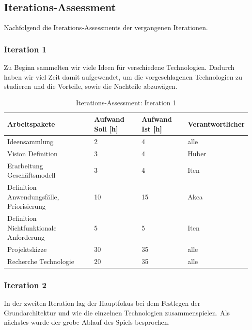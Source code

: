 \documentclass[11pt,ngerman]{article}
\begin{document}
\begin{table}[H]
	\label{tab:Iterationsplan}
    \end{table}

    \subsection{Iterations-Assessment}
    Nachfolgend die Iterations-Assessments der vergangenen Iterationen.

    \subsubsection{Iteration 1}

    Zu Beginn sammelten wir viele Ideen für verschiedene Technologien. Dadurch haben wir viel Zeit damit aufgewendet, um die vorgeschlagenen Technologien zu studieren und die Vorteile, sowie die Nachteile abzuwägen.

    \begin{table}[H]
    	\caption{Iterations-Assessment: Iteration 1}
    	\begin{tabularx}{\textwidth}{X l l l}
    		\toprule
    		Arbeitspakete & Aufwand Soll [h] & Aufwand Ist [h] & Verantwortlicher \\
    		\toprule
    		Ideensammlung & 2 & 4 & alle \\
    		Vision Definition & 3 & 4 & Huber \\
    		Erarbeitung Geschäftsmodell & 3 & 4 & Iten \\
    		Definition Anwendungsfälle, Priorisierung & 10 & 15 & Akca \\
    		Definition Nichtfunktionale Anforderung & 5 & 5 & Iten \\
    		Projektskizze & 30 & 35 & alle \\
    		Recherche Technologie & 20 & 35 & alle \\
    		\bottomrule
    	\end{tabularx}
    	\label{tab:Iterations-Assessment: Iteration 1}
    \end{table}



    \subsubsection{Iteration 2}

    In der zweiten Iteration lag der Hauptfokus bei dem Festlegen der Grundarchitektur und wie die einzelnen Technologien zusammenspielen. Als nächstes wurde der grobe Ablauf des Spiels besprochen.
\end{document}
